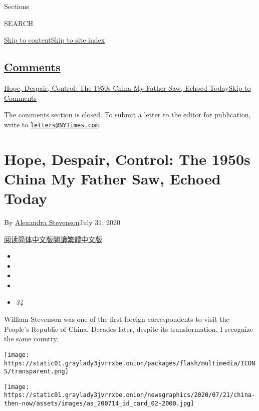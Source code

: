 Sections

SEARCH

\protect\hyperlink{site-content}{Skip to
content}\protect\hyperlink{site-index}{Skip to site index}

\hypertarget{comments}{%
\subsection{\texorpdfstring{\protect\hyperlink{commentsContainer}{Comments}}{Comments}}\label{comments}}

\href{}{Hope, Despair, Control: The 1950s China My Father Saw, Echoed
Today}\href{}{Skip to Comments}

The comments section is closed. To submit a letter to the editor for
publication, write to
\href{mailto:letters@NYTimes.com}{\nolinkurl{letters@NYTimes.com}}.

\hypertarget{hope-despair-control-the-1950s-china-my-father-saw-echoed-today}{%
\section{Hope, Despair, Control: The 1950s China My Father Saw, Echoed
Today}\label{hope-despair-control-the-1950s-china-my-father-saw-echoed-today}}

By
\href{https://www.nytimes3xbfgragh.onion/by/alexandra-stevenson}{Alexandra
Stevenson}July 31, 2020

\href{https://cn.nytimes3xbfgragh.onion/china/20200731/china-1950s-echoed-today/}{阅读简体中文版}\href{https://cn.nytimes3xbfgragh.onion/china/20200731/china-1950s-echoed-today/zh-hant/}{閱讀繁體中文版}

\begin{itemize}
\item
\item
\item
\item
\item
  \emph{34}
\end{itemize}

William Stevenson was one of the first foreign correspondents to visit
the People's Republic of China. Decades later, despite its
transformation, I recognize the same country.

\texttt{[image: https://static01.graylady3jvrrxbe.onion/packages/flash/multimedia/ICONS/transparent.png]}

\texttt{[image: https://static01.graylady3jvrrxbe.onion/newsgraphics/2020/07/21/china-then-now/assets/images/as\_200714\_id\_card\_02-2000.jpg]}


